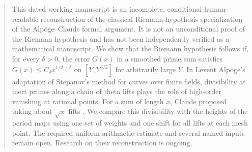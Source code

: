 \begin{abstract}
This dated working manuscript is an incomplete, conditional
human-readable reconstruction of the classical Riemann-hypothesis
specialization of the Alp\"oge--Claude formal argument. It is not an
unconditional proof of the Riemann hypothesis and has not been
independently verified as a mathematical manuscript. We show that the
Riemann hypothesis follows if, for every $\delta>0$, the error $G(x)$
in a smoothed prime sum satisfies
$G(x)\le C_\delta x^{1/2+\delta}$ on $[Y,Y^{3/2}]$ for arbitrarily
large $Y$. In Levent Alp\"oge's adaptation of Stepanov's method for
curves over finite fields, divisibility at inert primes along a chain
of theta lifts plays the role of high-order vanishing at rational
points. For a sum of length $x$, Claude proposed taking about
$\sqrt{x}$ lifts \citep[p.~1]{alpoge-remark}. We compare this
divisibility with the heights of the period maps using one set of
weights and one shift for all lifts at each mesh point. The required
uniform arithmetic estimate and several named inputs remain open.
Research on their reconstruction is ongoing.
\end{abstract}
